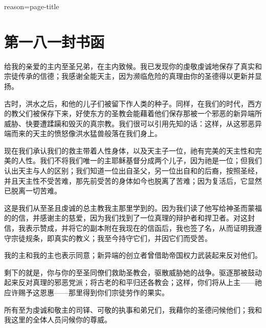 reason=page-title

\section{第一八一封书函}

\par

给我的亲爱的主内至圣兄弟，在主内致候。我已发现你的虔敬虔诚地保存了真实和宗徒传承的信德；我感谢全能天主，因为濒临危险的真理由你的圣德得以更新并显扬。\par

古时，洪水之后，和他的儿子们被留下作人类的种子。同样，在我们的时代，西方的教父们被保存下来，好使东方的圣教会能藉着他们保存那被一个邪恶的新异端所威胁、快要遭蹂躏和毁灭的真宗教。我们很可以引用先知的话：这样，从这邪恶异端而来的天主的愤怒像洪水猛兽般落在我们身上。\par

现在我们承认我们的救主带着人性身体，以及天主子一位，祂有完美的天主性和完美的人性。我们不将我们唯一的主耶稣基督分成两个儿子，因为祂是一位；但我们认出天主与人的区别；我们知道一位出自圣父，另一位出自和的后裔，按照圣经，并且天主性不受苦难，那先前受苦的身体如今也脱离了苦难；因为复活后，它显然已脱离一切苦难。\par

这是我们从至圣且虔诚的总主教我主那里学到的。因为我们读了他写给神圣而蒙福的的信，并感谢主的慈爱，因为我们找到了一位真理的辩护者和捍卫者。对这封信，我表示赞成，并将它的副本附在我现在的信函后，我也签了名，从而证明我遵守宗徒规条，即真实的教义；我至今持守它们，并因它们而受苦。\par

我的主和我的主也表示同意；新异端的创立者曾借助帝国权力武装起来反对他们。\par

剩下的就是，你与你的至圣同僚们救助圣教会，驱散威胁她的战争。驱逐那被鼓动起来反对真理的邪恶党派；将古老的和平归还各教会；这样，你们将从上主——祂应许赐予这恩惠——那里得到你们宗徒劳作的果实。\par

所有至为虔诚和敬主的司铎、可敬的执事和弟兄们，我藉你的圣德问候他们；我和我这里的全体人员问候你的尊威。\par

